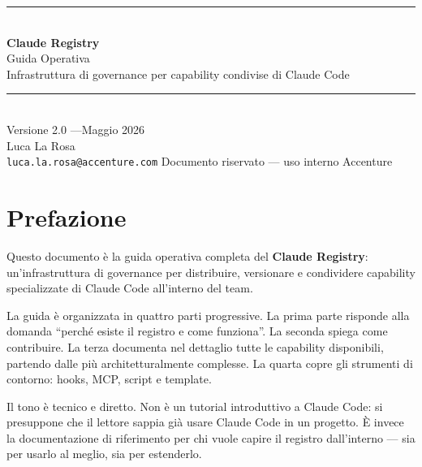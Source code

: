 \documentclass[12pt,a4paper,twoside]{book}
\begin{document}
\begin{titlepage}
  \centering
  \vspace*{3cm}
  {\color{AccentureBlue}\rule{\linewidth}{3pt}}\\[0.6cm]
  {\Huge\bfseries\color{AccentureBlue} Claude Registry}\\[0.4cm]
  {\LARGE\color{DarkGray} Guida Operativa}\\[0.2cm]
  {\large\color{MidGray} Infrastruttura di governance per capability condivise di Claude Code}\\[0.6cm]
  {\color{AccentureBlue}\rule{\linewidth}{1.5pt}}\\[1.5cm]
  {\large Versione 2.0 \quad—\quad Maggio 2026}\\[0.5cm]
  {\normalsize Luca La Rosa}\\[0.3cm]
  {\small\color{MidGray} \texttt{luca.la.rosa@accenture.com}}
  \vfill
  {\small\color{MidGray} Documento riservato — uso interno Accenture}
\end{titlepage}

\frontmatter
\tableofcontents
\clearpage

\chapter*{Prefazione}

Questo documento è la guida operativa completa del \textbf{Claude Registry}: un'infrastruttura di governance per distribuire, versionare e condividere capability specializzate di Claude Code all'interno del team.

La guida è organizzata in quattro parti progressive. La prima parte risponde alla domanda ``perché esiste il registro e come funziona''. La seconda spiega come contribuire. La terza documenta nel dettaglio tutte le capability disponibili, partendo dalle più architetturalmente complesse. La quarta copre gli strumenti di contorno: hooks, MCP, script e template.

Il tono è tecnico e diretto. Non è un tutorial introduttivo a Claude Code: si presuppone che il lettore sappia già usare Claude Code in un progetto. È invece la documentazione di riferimento per chi vuole capire il registro dall'interno — sia per usarlo al meglio, sia per estenderlo.
\end{document}
